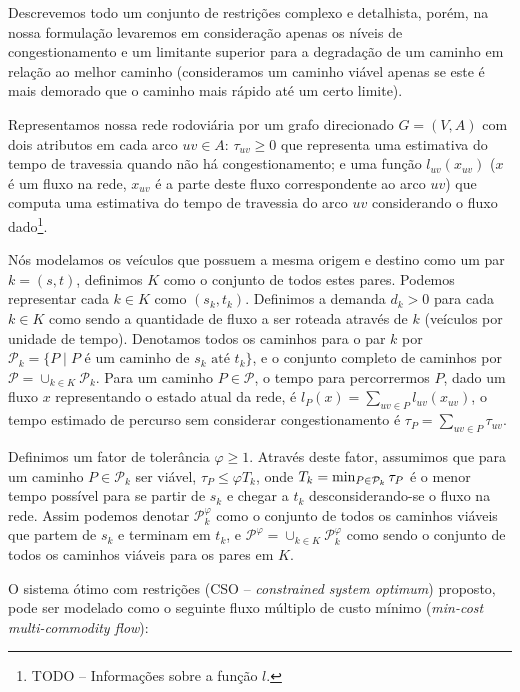 Descrevemos todo um conjunto de restrições complexo e detalhista, porém, 
na nossa formulação levaremos em consideração apenas os níveis de 
congestionamento e um limitante superior para a degradação de um caminho 
em relação ao melhor caminho (consideramos um caminho viável apenas se 
este é mais demorado que o caminho mais rápido até um certo limite).

Representamos nossa rede rodoviária por um grafo direcionado $G = (V, 
A)$ com dois atributos em cada arco $uv \in A$: $\tau_{uv} \geq 0$ que 
representa uma estimativa do tempo de travessia quando não há 
congestionamento; e uma função $l_{uv}(x_{uv})$ ($x$ é um fluxo na rede, 
$x_{uv}$ é a parte deste fluxo correspondente ao arco $uv$) que computa 
uma estimativa do tempo de travessia do arco $uv$ considerando o fluxo 
dado\footnote{
  TODO -- Informações sobre a função $l$.
}.

Nós modelamos os veículos que possuem a mesma origem e destino como um 
par $k = (s, t)$, definimos $K$ como o conjunto de todos estes pares.  
Podemos representar cada $k \in K$ como $(s_k, t_k)$. Definimos a 
demanda $d_k > 0$ para cada $k \in K$ como sendo a quantidade de fluxo a 
ser roteada através de $k$ (veículos por unidade de tempo). Denotamos 
todos os caminhos para o par $k$ por $\mathcal{P}_k = \{P \mid P \mbox{ 
é um caminho de } s_k \mbox{ até } t_k \}$, e o conjunto completo de 
caminhos por $\mathcal{P} = \cup_{k \in K}{\mathcal{P}_k}$. Para um 
caminho $P \in \mathcal{P}$, o tempo para percorrermos $P$, dado um 
fluxo $x$ representando o estado atual da rede, é $l_P(x) = \sum_{uv \in 
P}{l_{uv}(x_{uv})}$, o tempo estimado de percurso sem considerar 
congestionamento é $\tau_P = \sum_{uv \in P}{\tau_{uv}}$.

Definimos um fator de tolerância $\varphi \geq 1$. Através deste fator, 
assumimos que para um caminho $P \in \mathcal{P}_k$ ser viável, $\tau_P 
\leq \varphi T_k$, onde $T_k = \min_{P \in {\cal P}_k}{\tau_P}$ é o 
menor tempo possível para se partir de $s_k$ e chegar a $t_k$ 
desconsiderando-se o fluxo na rede.  Assim podemos denotar 
$\mathcal{P}_k^\varphi$ como o conjunto de todos os caminhos viáveis que 
partem de $s_k$ e terminam em $t_k$, e $\mathcal{P}^\varphi = \cup_{k 
\in K}{\mathcal{P}_k^\varphi}$ como sendo o conjunto de todos os 
caminhos viáveis para os pares em $K$.

O sistema ótimo com restrições (\textsc{CSO} -- \emph{constrained system 
optimum}) proposto, pode ser modelado como o seguinte fluxo múltiplo de 
custo mínimo (\emph{min-cost multi-commodity flow}):

